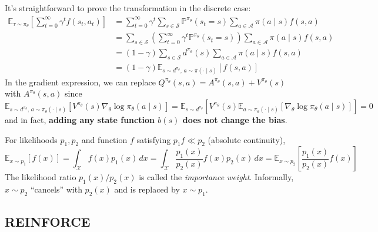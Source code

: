 \documentclass[11pt, letterpaper]{article}
\begin{document}
\begin{remark}
    It's straightforward to prove the transformation in the discrete case: 
    \begin{align*}
        \mathbb{E}_{\tau \sim \pi_\theta}\left[\sum_{t=0}^\infty \gamma^t f(s_t, a_t)\right]
        &= \sum_{t=0}^\infty \gamma^t \sum_{s \in \mathcal{S}} \mathbb{P}^{\pi_\theta}(s_t = s) \sum_{a \in \mathcal{A}} \pi(a \mid s) f(s, a) \\
        &= \sum_{s \in \mathcal{S}} \left( \sum_{t=0}^\infty \gamma^t \mathbb{P}^{\pi_\theta}(s_t = s) \right) \sum_{a \in \mathcal{A}} \pi(a \mid s) f(s, a) \\
        &= (1 - \gamma) \sum_{s \in \mathcal{S}} d^{\pi_\theta}(s) \sum_{a \in \mathcal{A}} \pi(a \mid s) f(s, a) \\
        &= (1 - \gamma) \mathbb{E}_{s \sim d^{\pi_\theta},\, a \sim \pi(\cdot \mid s)}[f(s, a)]
    \end{align*}
    In the gradient expression, we can replace \(Q^{\pi_\theta}(s,a) = A^{\pi_\theta}(s,a) + V^{\pi_\theta}(s)\) with \(A^{\pi_\theta}(s,a)\) since
    \[
        \mathbb{E}_{s \sim d^{\pi_\theta},\, a \sim \pi_\theta(\cdot \mid s)}[V^{\pi_\theta}(s) \nabla_\theta \log \pi_\theta(a \mid s)]
        = \mathbb{E}_{s \sim d^{\pi_\theta}}[V^{\pi_\theta}(s) \mathbb{E}_{a \sim \pi_\theta(\cdot \mid s)}[\nabla_\theta \log \pi_\theta(a \mid s)]] = 0
    \]
    and in fact, \textbf{adding any state function \(b(s)\) does not change the bias}. 
\end{remark}

\begin{concept}
    For likelihoods \(p_1, p_2\) and function \(f\) satisfying \(p_1 f \ll p_2\) (absolute continuity),
    \[
        \mathbb{E}_{x \sim p_1}[f(x)]
        = \int_{\mathcal{X}} f(x) p_1(x) \,dx
        = \int_{\mathcal{X}} \frac{p_1(x)}{p_2(x)} f(x) p_2(x) \,dx
        = \mathbb{E}_{x \sim p_2} \left[ \frac{p_1(x)}{p_2(x)} f(x) \right]
    \]
    The likelihood ratio \(p_1(x) / p_2(x)\) is called the \textit{importance weight}. Informally, \(x \sim p_2\) ``cancels'' with \(p_2(x)\) and is replaced by \(x \sim p_1\). 
\end{concept}

\subsection{REINFORCE}
\end{document}
